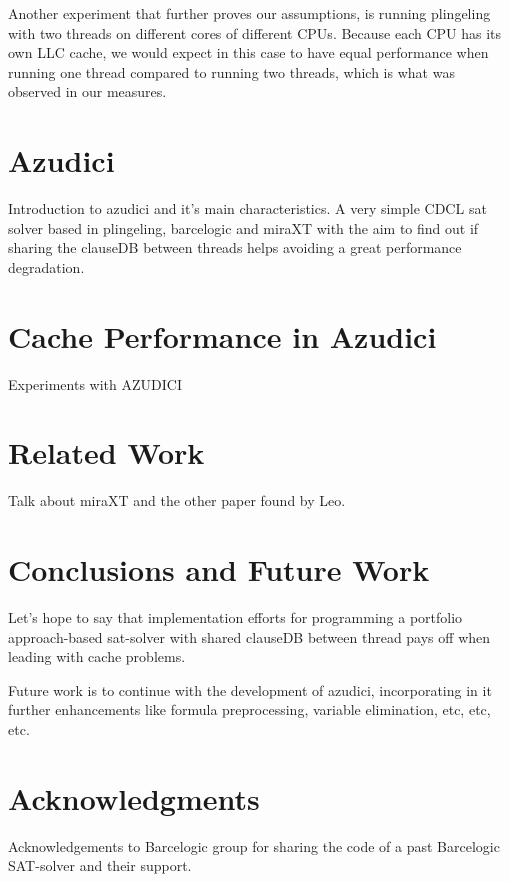 \documentclass{llncs}
\begin{document}
Another experiment that further proves our assumptions, is running plingeling with two threads on different cores of different CPUs. Because each CPU has its own LLC cache, we would expect in this case to have equal performance when running one thread compared to running two threads, which is what was observed in our measures. 

\section{Azudici}
\label{sec:azudici}

Introduction to azudici and it's main characteristics. A very simple
CDCL sat solver based in plingeling, barcelogic and miraXT with the
aim to find out if sharing the clauseDB between threads helps avoiding
a great performance degradation.

\section{Cache Performance in Azudici}

Experiments with AZUDICI

\section{Related Work}

Talk about miraXT and the other paper found by Leo.

\section{Conclusions and Future Work}

Let's hope to say that implementation efforts for programming a
portfolio approach-based sat-solver with shared clauseDB between
thread pays off when leading with cache problems.

Future work is to continue with the development of  azudici,
incorporating in it further enhancements like formula preprocessing,
variable elimination, etc, etc, etc.

\section*{Acknowledgments}

Acknowledgements to Barcelogic group for sharing the code of a past
Barcelogic SAT-solver and their support.




\end{document}
